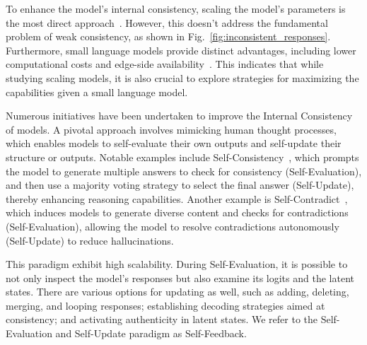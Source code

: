 \documentclass[lettersize,journal]{IEEEtran}
\begin{document}
\noindent To enhance the model's internal consistency, scaling the model's parameters is the most direct approach~\cite{kaplan2020scaling}. However, this doesn't address the fundamental problem of weak consistency, as shown in Fig.~\ref{fig:inconsistent_responses}. Furthermore, small language models provide distinct advantages, including lower computational costs and edge-side availability~\cite{hillier2024super}. This indicates that while studying scaling models, it is also crucial to explore strategies for maximizing the capabilities given a small language model.


Numerous initiatives have been undertaken to improve the Internal Consistency of models. A pivotal approach involves mimicking human thought processes, which enables models to self-evaluate their own outputs and self-update their structure or outputs. Notable examples include Self-Consistency~\cite{SelfConsistency_23_ICLR_Google}, which prompts the model to generate multiple answers to check for consistency (Self-Evaluation), and then use a majority voting strategy to select the final answer (Self-Update), thereby enhancing reasoning capabilities. Another example is Self-Contradict~\cite{HalluSelfContradictory_24_ICLR_ETH}, which induces models to generate diverse content and checks for contradictions (Self-Evaluation), allowing the model to resolve contradictions autonomously (Self-Update) to reduce hallucinations.

This paradigm exhibit high scalability. During Self-Evaluation, it is possible to not only inspect the model's responses but also examine its logits and the latent states. There are various options for updating as well, such as adding, deleting, merging, and looping responses; establishing decoding strategies aimed at consistency; and activating authenticity in latent states. We refer to the Self-Evaluation and Self-Update paradigm as Self-Feedback.
\end{document}
